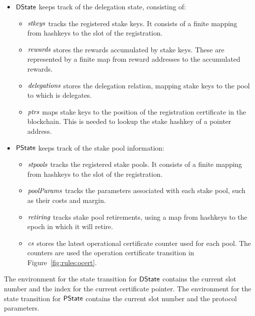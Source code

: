 \begin{itemize}
  \item $\mathsf{DState}$ keeps track of the delegation state, consisting of:
    \begin{itemize}
      \item $\mathit{stkeys}$ tracks the registered stake keys. It consists of a finite
        mapping from hashkeys to the slot of the registration.
      \item $\mathit{rewards}$ stores the rewards accumulated by stake keys.
        These are represented by a finite map from reward addresses to the accumulated rewards.
      \item $\mathit{delegations}$ stores the delegation relation, mapping stake keys to the
        pool to which is delegates.
      \item $\mathit{ptrs}$ maps stake keys to the position of the registration certificate
        in the blockchain. This is needed to lookup the stake hashkey of a pointer address.
    \end{itemize}
  \item $\mathsf{PState}$ keeps track of the stake pool information:
    \begin{itemize}
      \item $\mathit{stpools}$ tracks the registered stake pools. It consists of a finite
        mapping from hashkeys to the slot of the registration.
      \item $\mathit{poolParams}$ tracks the parameters associated with each stake pool, such as
        their costs and margin.
      \item $\mathit{retiring}$ tracks stake pool retirements, using a map from hashkeys to
        the epoch in which it will retire.
      \item $\mathit{cs}$ stores the latest operational certificate counter used for each pool.
        The counters are used the operation certificate transition in Figure~\ref{fig:rules:ocert}.
    \end{itemize}
\end{itemize}

The environment for the state transition for $\mathsf{DState}$ contains the current slot number
and the index for the current certificate pointer.
The environment for the state transition for $\mathsf{PState}$ contains the current slot number
and the protocol parameters.


